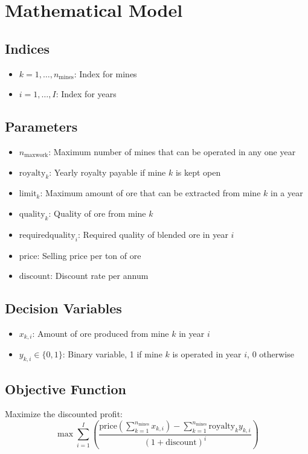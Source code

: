 \documentclass{article}
\begin{document}
\section*{Mathematical Model}

\subsection*{Indices}
\begin{itemize}
    \item $k = 1, \ldots, n_{\text{mines}}$: Index for mines
    \item $i = 1, \ldots, I$: Index for years
\end{itemize}

\subsection*{Parameters}
\begin{itemize}
    \item $n_{\text{maxwork}}$: Maximum number of mines that can be operated in any one year
    \item $\text{royalty}_k$: Yearly royalty payable if mine $k$ is kept open
    \item $\text{limit}_k$: Maximum amount of ore that can be extracted from mine $k$ in a year
    \item $\text{quality}_k$: Quality of ore from mine $k$
    \item $\text{requiredquality}_i$: Required quality of blended ore in year $i$
    \item $\text{price}$: Selling price per ton of ore
    \item $\text{discount}$: Discount rate per annum
\end{itemize}

\subsection*{Decision Variables}
\begin{itemize}
    \item $x_{k,i}$: Amount of ore produced from mine $k$ in year $i$
    \item $y_{k,i} \in \{0, 1\}$: Binary variable, 1 if mine $k$ is operated in year $i$, 0 otherwise
\end{itemize}

\subsection*{Objective Function}
Maximize the discounted profit:
\[
\max \sum_{i=1}^{I} \left( \frac{\text{price} \left(\sum_{k=1}^{n_{\text{mines}}} x_{k,i}\right) - \sum_{k=1}^{n_{\text{mines}}} \text{royalty}_k y_{k,i}}{(1 + \text{discount})^i} \right)
\]
\end{document}
